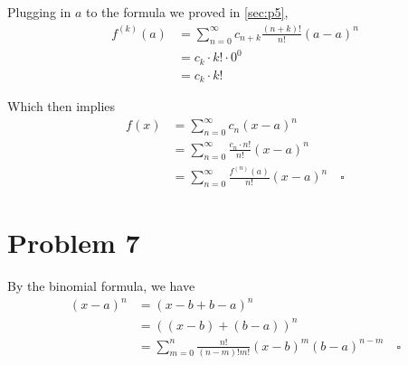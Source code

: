 \documentclass[12pt]{article}
\begin{document}
Plugging in $a$ to the formula we proved in \ref{sec:p5},
\begin{align*}
    f^{(k)}(a)
    &=\sum_{n=0}^\infty c_{n+k}\frac{(n+k)!}{n!}(a-a)^n \\
    &=c_k \cdot k! \cdot 0^0 \\
    &= c_k \cdot k!
\end{align*}

Which then implies
\begin{align*}
    f(x)
    &=\sum_{n=0}^\infty c_n(x-a)^n \\
    &=\sum_{n=0}^\infty \frac{c_n \cdot n!}{n!}(x-a)^n \\
    &=\sum_{n=0}^\infty \frac{f^{(n)}(a)}{n!}(x-a)^n\quad\square
\end{align*}

\section{Problem 7}

By the binomial formula, we have
\begin{align*}
    (x-a)^n
    &= (x-b+b-a)^n \\
    &= ((x-b)+(b-a))^n \\
    &= \sum_{m=0}^n \frac{n!}{(n-m)!m!} (x-b)^m(b-a)^{n-m}\quad\square
\end{align*}
\end{document}
